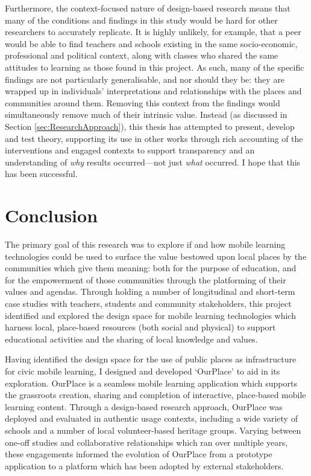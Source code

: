Furthermore, the context-focused nature of design-based research means that many of the conditions and findings in this study would be hard for other researchers to accurately replicate. It is highly unlikely, for example, that a peer would be able to find teachers and schools existing in the same socio-economic, professional and political context, along with classes who shared the same attitudes to learning as those found in this project. As such, many of the specific findings are not particularly generalisable, and nor should they be: they are wrapped up in individuals' interpretations and relationships with the places and communities around them. Removing this context from the findings would simultaneously remove much of their intrinsic value. Instead (as discussed in Section \ref{sec:ResearchApproach}), this thesis has attempted to present, develop and test theory, supporting its use in other works through rich accounting of the interventions and engaged contexts to support transparency and an understanding of \textit{why} results occurred---not just \textit{what} occurred. I hope that this has been successful.

\section{Conclusion}

The primary goal of this research was to explore if and how mobile learning technologies could be used to surface the value bestowed upon local places by the communities which give them meaning: both for the purpose of education, and for the empowerment of those communities through the platforming of their values and agendas. Through holding a number of longitudinal and short-term case studies with teachers, students and community stakeholders, this project identified and explored the design space for mobile learning technologies which harness local, place-based resources (both social and physical) to support educational activities and the sharing of local knowledge and values. 

Having identified the design space for the use of public places as infrastructure for civic mobile learning, I designed and developed `OurPlace' to aid in its exploration. OurPlace is a seamless mobile learning application which supports the grassroots creation, sharing and completion of interactive, place-based mobile learning content. Through a design-based research approach, OurPlace was deployed and evaluated in authentic usage contexts, including a wide variety of schools and a number of local volunteer-based heritage groups. Varying between one-off studies and collaborative relationships which ran over multiple years, these engagements informed the evolution of OurPlace from a prototype application to a platform which has been adopted by external stakeholders.

